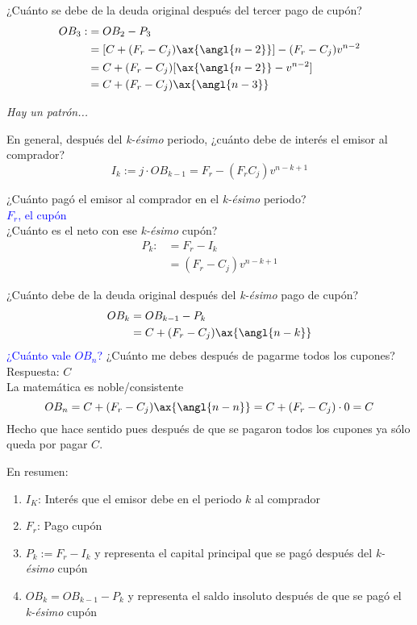 ¿Cuánto se debe de la deuda original después del tercer pago de cupón?
\begin{align*}
    OB_3 :&= OB_2-P_3\\
    &= [C+(F_r-C_j)\ax{\angl{n-2}}] - (F_r-C_j)v^{n-2}\\
    &= C+(F_r-C_j)[\ax{\angl{n-2}}-v^{n-2}]\\
    &= C+(F_r-C_j)\ax{\angl{n-3}}
\end{align*}

\textit{Hay un patrón...}

En general, después del \textit{k-ésimo} periodo, ¿cuánto debe de interés el emisor al comprador?
$$I_k:= j\cdot OB_{k-1} = F_r - (F_rC_j)v^{n-k+1}$$

¿Cuánto pagó el emisor al comprador en el \textit{k-ésimo} periodo?\\
\textcolor{blue}{$F_r$, el cupón}\\

¿Cuánto es el neto con ese \textit{k-ésimo} cupón?
\begin{align*}
    P_k :&= F_r-I_k\\
    &= (F_r-C_j)v^{n-k+1}
\end{align*}

¿Cuánto debe de la deuda original después del \textit{k-ésimo} pago de cupón?
\begin{align*}
    OB_k &= OB_{k-1} - P_k\\
    &= C+ (F_r-C_j)\ax{\angl{n-k}}
\end{align*}
\textcolor{blue}{¿Cuánto vale $OB_n$?} ¿Cuánto me debes después de pagarme todos los cupones? \\
Respuesta: $C$\\
La matemática es noble/consistente
$$OB_n = C + (F_r - C_j)\ax{\angl{n-n}} = C + (F_r-C_j)\cdot 0 = C$$
Hecho que hace sentido pues después de que se pagaron todos los cupones ya sólo queda por pagar $C$.

En resumen:
\begin{enumerate}
    \item $I_K$: Interés que el emisor debe en el periodo $k$ al comprador
    \item $F_r$: Pago cupón
    \item $P_k:=F_r-I_k$ y representa el capital principal que se pagó después del \textit{k-ésimo} cupón
    \item $OB_k=OB_{k-1}-P_k$ y representa el saldo insoluto después de que se pagó el \textit{k-ésimo} cupón
\end{enumerate}

